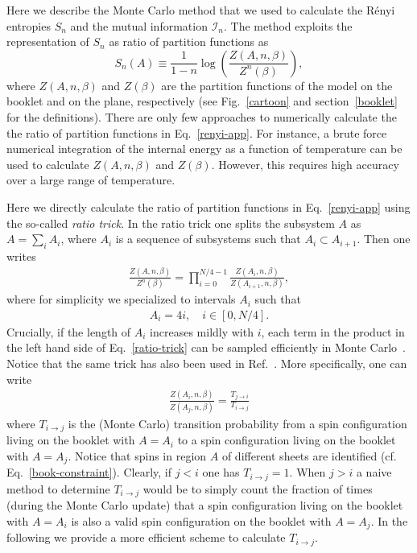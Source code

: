 \documentclass[twocolumn,superscriptaddress,prb,10pt]{revtex4-1}
\begin{document}
Here we describe the Monte Carlo method that we used to calculate the R\'enyi entropies 
$S_n$ and the mutual information ${\mathcal I}_n$. The method exploits the representation 
of $S_n$ as ratio of partition functions as 
%
\begin{equation}
\label{renyi-app}
S_n(A)\equiv \frac{1}{1-n}\log\left(\frac{Z(A,n,\beta)}{Z^n(\beta)}\right),
\end{equation}
%
where $Z(A,n,\beta)$ and $Z(\beta)$ are the partition functions of the model on the booklet and 
on the plane, respectively (see Fig.~\ref{cartoon} and section~\ref{booklet} for the definitions).  
There are only few approaches to numerically calculate the the ratio of partition functions in 
Eq.~\eqref{renyi-app}. For instance, a brute force numerical integration of the internal energy as 
a function of temperature\cite{jaconis-2013} can be used to calculate $Z(A,n,\beta)$ and $Z(\beta)$. 
However, this requires high accuracy over a large range of temperature.

Here we directly calculate the ratio of partition functions in Eq.~\eqref{renyi-app} using the 
so-called \emph{ratio trick}. In the ratio trick one splits the subsystem $A$ as $A=\sum_{i}A_i$, 
where $A_i$ is a sequence of subsystems such that $A_i\subset A_{i+1}$. 
Then one writes 
%
\begin{align}
\label{ratio-trick}
\frac{Z(A,n,\beta)}{ Z^n(\beta)} = \prod_{i=0}^{N/4-1} \frac{Z(A_i,n,\beta)}{Z(A_{i+1},n,\beta)},
\end{align}
%
where for simplicity we specialized to intervals $A_i$ such that
%
\begin{align}
\label{sub-choice}
A_i = 4i,\quad i \in [0,N/4] .
\end{align}
%
Crucially, if the length of $A_i$ increases mildly with $i$, each term in the product 
in the left hand side of Eq.~\eqref{ratio-trick} can be sampled efficiently in Monte 
Carlo~\cite{stephan-2014}. Notice that the same trick has also been used in 
Ref.~. More specifically, one can write
%
\begin{align}
\frac{Z(A_i,n,\beta)}{Z(A_{j},n,\beta)} = \frac{T_{j\rightarrow i}}{T_{i\rightarrow j}}
\end{align}
%
where $T_{i\rightarrow j}$  is the (Monte Carlo) transition probability from a spin 
configuration living on the booklet with $A=A_i$ to a spin configuration living on the 
booklet with $A=A_j$. Notice that spins in region $A$ of different sheets are identified 
(cf. Eq.~\eqref{book-constraint}). Clearly, if $j<i$ one has $T_{i\rightarrow j}=1$.
When $j>i$ a naive method to determine $T_{i\rightarrow j}$ would be to simply count the 
fraction of times (during the Monte Carlo update) that a spin configuration living on 
the booklet with $A=A_i$ is also a valid spin configuration on the booklet with $A=A_j$.
In the following we provide a more efficient scheme to calculate $T_{i\rightarrow j}$.
\end{document}
